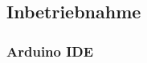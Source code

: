 %
%
%
%
%
%
%
%
%
%

\subsection{Inbetriebnahme}

\subsubsection{Arduino IDE}\label{Appendix:ESP32_Arduino_IDE}
%

